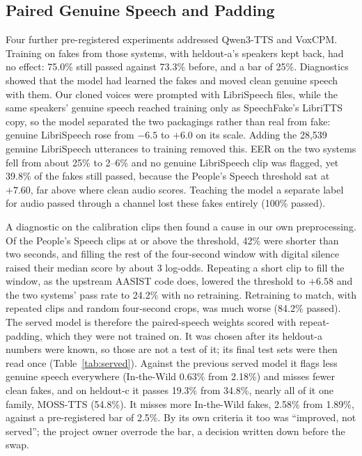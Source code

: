 \documentclass[journal]{IEEEtran}
\begin{document}
\subsection{Paired Genuine Speech and Padding}
Four further pre-registered experiments addressed Qwen3-TTS and VoxCPM.
Training on fakes from those systems, with heldout-a's speakers kept back, had
no effect: 75.0\% still passed against 73.3\% before, and a bar of 25\%.
Diagnostics showed that the model had learned the fakes and moved clean
genuine speech with them. Our cloned voices were prompted with LibriSpeech
files, while the same speakers' genuine speech reached training only as
SpeechFake's LibriTTS copy, so the model separated the two packagings rather
than real from fake: genuine LibriSpeech rose from $-6.5$ to $+6.0$ on its
scale. Adding the 28{,}539 genuine LibriSpeech utterances to training removed
this. EER on the two systems fell from about 25\% to 2--6\% and no genuine
LibriSpeech clip was flagged, yet 39.8\% of the fakes still passed, because
the People's Speech threshold sat at $+7.60$, far above where clean audio
scores. Teaching the model a separate label for audio passed through a
channel lost these fakes entirely (100\% passed).

A diagnostic on the calibration clips then found a cause in our own
preprocessing. Of the People's Speech clips at or above the threshold, 42\%
were shorter than two seconds, and filling the rest of the four-second window
with digital silence raised their median score by about 3 log-odds. Repeating
a short clip to fill the window, as the upstream AASIST code does, lowered the
threshold to $+6.58$ and the two systems' pass rate to 24.2\% with no
retraining. Retraining to match, with repeated clips and random four-second
crops, was much worse (84.2\% passed). The served model is therefore the
paired-speech weights scored with repeat-padding, which they were not trained
on. It was chosen after its heldout-a numbers were known, so those are not a
test of it; its final test sets were then read once (Table~\ref{tab:served}).
Against the previous served model it flags less genuine speech everywhere
(In-the-Wild 0.63\% from 2.18\%) and misses fewer clean fakes, and on
heldout-c it passes 19.3\% from 34.8\%, nearly all of it one family, MOSS-TTS
(54.8\%). It misses more In-the-Wild fakes, 2.58\% from 1.89\%, against a
pre-registered bar of 2.5\%. By its own criteria it too was ``improved, not
served''; the project owner overrode the bar, a decision written down before
the swap.

\end{document}
